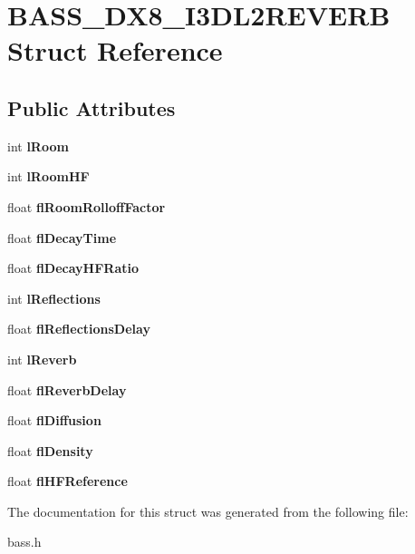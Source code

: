 \section{B\+A\+S\+S\+\_\+\+D\+X8\+\_\+\+I3\+D\+L2\+R\+E\+V\+E\+R\+B Struct Reference}
\label{struct_b_a_s_s___d_x8___i3_d_l2_r_e_v_e_r_b}
\subsection*{Public Attributes}
\begin{DoxyCompactItemize}
\item 
int {\bfseries l\+Room}\label{struct_b_a_s_s___d_x8___i3_d_l2_r_e_v_e_r_b_a520686858323f3210f4c36d6a9cb510c}

\item 
int {\bfseries l\+Room\+H\+F}\label{struct_b_a_s_s___d_x8___i3_d_l2_r_e_v_e_r_b_a808a172f5de62ae509adc6fa2c403537}

\item 
float {\bfseries fl\+Room\+Rolloff\+Factor}\label{struct_b_a_s_s___d_x8___i3_d_l2_r_e_v_e_r_b_ac4e7a936bb33324e4f2845ae4a5d7d4c}

\item 
float {\bfseries fl\+Decay\+Time}\label{struct_b_a_s_s___d_x8___i3_d_l2_r_e_v_e_r_b_a4698afcd5cb82a19422122e048c488a5}

\item 
float {\bfseries fl\+Decay\+H\+F\+Ratio}\label{struct_b_a_s_s___d_x8___i3_d_l2_r_e_v_e_r_b_a86d473034e7f77d712d0f4c9595956c3}

\item 
int {\bfseries l\+Reflections}\label{struct_b_a_s_s___d_x8___i3_d_l2_r_e_v_e_r_b_a218715f13676217b76c0ffaf4f9a1b1b}

\item 
float {\bfseries fl\+Reflections\+Delay}\label{struct_b_a_s_s___d_x8___i3_d_l2_r_e_v_e_r_b_a2f14853c94f1c1a9cd2c262ec184f0a5}

\item 
int {\bfseries l\+Reverb}\label{struct_b_a_s_s___d_x8___i3_d_l2_r_e_v_e_r_b_abb5ecb3324ef2baf89a705b7ea2e2b11}

\item 
float {\bfseries fl\+Reverb\+Delay}\label{struct_b_a_s_s___d_x8___i3_d_l2_r_e_v_e_r_b_a6b4b4d42d466a042dcce95a9b6ffc75a}

\item 
float {\bfseries fl\+Diffusion}\label{struct_b_a_s_s___d_x8___i3_d_l2_r_e_v_e_r_b_a68c326cead487bc08eb060ff0492029a}

\item 
float {\bfseries fl\+Density}\label{struct_b_a_s_s___d_x8___i3_d_l2_r_e_v_e_r_b_a74924c051e337eabbe439bea2e4cfb15}

\item 
float {\bfseries fl\+H\+F\+Reference}\label{struct_b_a_s_s___d_x8___i3_d_l2_r_e_v_e_r_b_a3074421854b36b937c7d4cb22606fc9d}

\end{DoxyCompactItemize}


The documentation for this struct was generated from the following file\+:\begin{DoxyCompactItemize}
\item 
bass.\+h\end{DoxyCompactItemize}
